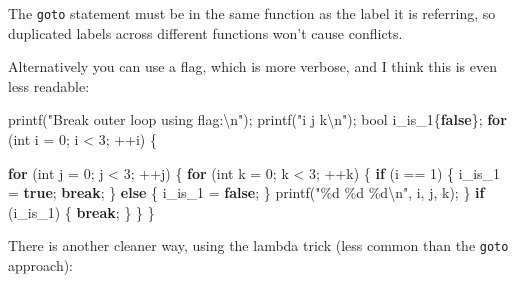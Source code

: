 \documentclass[
]{book}
\newenvironment{Shaded}{\begin{snugshade}}{\end{snugshade}}
\newcommand{\ControlFlowTok}[1]{\textcolor[rgb]{0.13,0.29,0.53}{\textbf{#1}}}
\newcommand{\DataTypeTok}[1]{\textcolor[rgb]{0.13,0.29,0.53}{#1}}
\newcommand{\DecValTok}[1]{\textcolor[rgb]{0.00,0.00,0.81}{#1}}
\newcommand{\KeywordTok}[1]{\textcolor[rgb]{0.13,0.29,0.53}{\textbf{#1}}}
\newcommand{\NormalTok}[1]{#1}
\newcommand{\SpecialCharTok}[1]{\textcolor[rgb]{0.00,0.00,0.00}{#1}}
\newcommand{\StringTok}[1]{\textcolor[rgb]{0.31,0.60,0.02}{#1}}
\begin{document}
The \texttt{goto} statement must be in the same function as the label it is referring,
so duplicated labels across different functions won't cause conflicts.

Alternatively you can use a flag, which is more verbose, and I think this is even less readable:

\begin{Shaded}
\begin{Highlighting}[]
\NormalTok{printf(}\StringTok{"Break outer loop using flag:}\SpecialCharTok{\textbackslash{}n}\StringTok{"}\NormalTok{);}
\NormalTok{printf(}\StringTok{"i j k}\SpecialCharTok{\textbackslash{}n}\StringTok{"}\NormalTok{);}
\DataTypeTok{bool}\NormalTok{ i\_is\_1\{}\KeywordTok{false}\NormalTok{\};}
\ControlFlowTok{for}\NormalTok{ (}\DataTypeTok{int}\NormalTok{ i = }\DecValTok{0}\NormalTok{; i \textless{} }\DecValTok{3}\NormalTok{; ++i)}
\NormalTok{\{}

    \ControlFlowTok{for}\NormalTok{ (}\DataTypeTok{int}\NormalTok{ j = }\DecValTok{0}\NormalTok{; j \textless{} }\DecValTok{3}\NormalTok{; ++j)}
\NormalTok{    \{}
        \ControlFlowTok{for}\NormalTok{ (}\DataTypeTok{int}\NormalTok{ k = }\DecValTok{0}\NormalTok{; k \textless{} }\DecValTok{3}\NormalTok{; ++k)}
\NormalTok{        \{}
            \ControlFlowTok{if}\NormalTok{ (i == }\DecValTok{1}\NormalTok{)}
\NormalTok{            \{}
\NormalTok{                i\_is\_1 = }\KeywordTok{true}\NormalTok{;}
                \ControlFlowTok{break}\NormalTok{;}
\NormalTok{            \}}
            \ControlFlowTok{else}
\NormalTok{            \{}
\NormalTok{                i\_is\_1 = }\KeywordTok{false}\NormalTok{;}
\NormalTok{            \}}
\NormalTok{            printf(}\StringTok{"}\SpecialCharTok{\%d}\StringTok{ }\SpecialCharTok{\%d}\StringTok{ }\SpecialCharTok{\%d\textbackslash{}n}\StringTok{"}\NormalTok{, i, j, k);}
\NormalTok{        \}}
        \ControlFlowTok{if}\NormalTok{ (i\_is\_1)}
\NormalTok{        \{}
            \ControlFlowTok{break}\NormalTok{;}
\NormalTok{        \}}
\NormalTok{    \}}
\NormalTok{\}}
\end{Highlighting}
\end{Shaded}

There is another cleaner way, using the lambda trick (less common than the \texttt{goto} approach):
\end{document}
